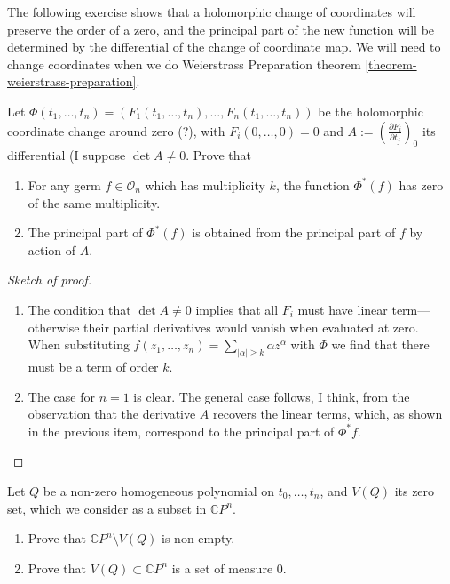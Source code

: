 The following exercise shows that a holomorphic change of coordinates will
preserve the order of a zero, and the principal part of the new function will be
determined by the differential of the change of coordinate map. We will need to
change coordinates when we do Weierstrass Preparation theorem
\ref{theorem-weierstrass-preparation}.

\begin{exercise}
\label{exercise-principal-part-under-coordinate-change}
Let $\Phi(t_1,\ldots,t_n)=(F_1(t_1,\ldots,t_n),\ldots,F_n(t_1,\ldots,t_n))$ be
the holomorphic coordinate change around zero (?), with $F_i(0,\ldots,0)=0$ and
$A:=\left(\frac{\partial F_i}{\partial t_j}\right)_0$ its differential (I suppose
$\det A \neq 0$. Prove that
\begin{enumerate}
\item For any germ $f\in \mathcal{O}_n$ which has multiplicity $k$, the function
$\Phi^*(f)$ has zero of the same multiplicity.
\item The principal part of $\Phi^*(f)$ is obtained from the principal part of
$f$ by action of $A$.
\end{enumerate}
\end{exercise}

\begin{proof}[Sketch of proof]
\begin{enumerate}
\item The condition that $\det A \neq 0$ implies that all $F_i$ must have linear
term---otherwise their partial derivatives would vanish when evaluated at zero.
When substituting $f(z_1,\ldots,z_n)=\sum_{|\alpha|\geq k}\alpha z^\alpha$ with
$\Phi$ we find that there must be a term of order $k$.
\item The case for $n=1$ is clear. The general case follows, I think, from the
observation that the derivative $A$ recovers the linear terms, which, as shown
in the previous item, correspond to the principal part of $\Phi^*f$.
\end{enumerate}
\end{proof}

\begin{exercise}
\label{exercise-zero-locus-of-homogeneous-polynomial}
Let $Q$ be a non-zero homogeneous polynomial on $t_0,\ldots,t_n$, and $V(Q)$ its
zero set, which we consider as a subset in $\mathbb{C}P^{n}$.
\begin{enumerate}
\item Prove that $\mathbb{C}P^{n}\setminus V(Q)$ is non-empty.
\item Prove that $V(Q)\subset\mathbb{C}P^{n}$ is a set of measure 0.
\end{enumerate}
\end{exercise}

